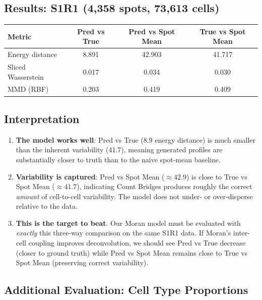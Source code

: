 \documentclass[11pt]{article}
\begin{document}
\subsection{Results: S1R1 (4{,}358 spots, 73{,}613 cells)}

\begin{center}
\begin{tabular}{lccc}
\toprule
Metric & Pred vs True & Pred vs Spot Mean & True vs Spot Mean \\
\midrule
Energy distance    & 8.891  & 42.903 & 41.717 \\
Sliced Wasserstein & 0.017  & 0.034  & 0.030 \\
MMD (RBF)          & 0.203  & 0.419  & 0.409 \\
\bottomrule
\end{tabular}
\end{center}

\subsection{Interpretation}

\begin{enumerate}
  \item \textbf{The model works well}: Pred vs True (8.9 energy distance) is much smaller than the inherent variability (41.7), meaning generated profiles are substantially closer to truth than to the naive spot-mean baseline.

  \item \textbf{Variability is captured}: Pred vs Spot Mean ($\approx 42.9$) is close to True vs Spot Mean ($\approx 41.7$), indicating Count Bridges produces roughly the correct \emph{amount} of cell-to-cell variability. The model does not under- or over-disperse relative to the data.

  \item \textbf{This is the target to beat}. Our Moran model must be evaluated with \emph{exactly} this three-way comparison on the same S1R1 data. If Moran's inter-cell coupling improves deconvolution, we should see Pred vs True decrease (closer to ground truth) while Pred vs Spot Mean remains close to True vs Spot Mean (preserving correct variability).
\end{enumerate}

\subsection{Additional Evaluation: Cell Type Proportions}
\end{document}
